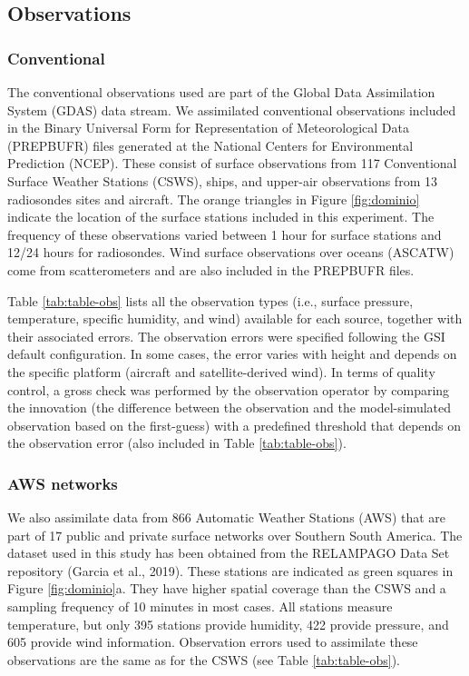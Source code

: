 \documentclass[final,5p,times,twocolumn,authoryear]{elsarticle} %
\begin{document}
\hypertarget{observations}{%
\subsection{Observations}\label{observations}}

\hypertarget{conventional}{%
\subsubsection{Conventional}\label{conventional}}

The conventional observations used are part of the Global Data Assimilation System (GDAS) data stream. We assimilated conventional observations included in the Binary Universal Form for Representation of Meteorological Data (PREPBUFR) files generated at the National Centers for Environmental Prediction (NCEP). These consist of surface observations from 117 Conventional Surface Weather Stations (CSWS), ships, and upper-air observations from 13 radiosondes sites and aircraft. The orange triangles in Figure \ref{fig:dominio} indicate the location of the surface stations included in this experiment. The frequency of these observations varied between 1 hour for surface stations and 12/24 hours for radiosondes. Wind surface observations over oceans (ASCATW) come from scatterometers and are also included in the PREPBUFR files.

Table \ref{tab:table-obs} lists all the observation types (i.e., surface pressure, temperature, specific humidity, and wind) available for each source, together with their associated errors. The observation errors were specified following the GSI default configuration. In some cases, the error varies with height and depends on the specific platform (aircraft and satellite-derived wind). In terms of quality control, a gross check was performed by the observation operator by comparing the innovation (the difference between the observation and the model-simulated observation based on the first-guess) with a predefined threshold that depends on the observation error (also included in Table \ref{tab:table-obs}).

\hypertarget{aws-networks}{%
\subsubsection{AWS networks}\label{aws-networks}}

We also assimilate data from 866 Automatic Weather Stations (AWS) that are part of 17 public and private surface networks over Southern South America. The dataset used in this study has been obtained from the RELAMPAGO Data Set repository (Garcia et al., 2019). These stations are indicated as green squares in Figure \ref{fig:dominio}a. They have higher spatial coverage than the CSWS and a sampling frequency of 10 minutes in most cases. All stations measure temperature, but only 395 stations provide humidity, 422 provide pressure, and 605 provide wind information.
Observation errors used to assimilate these observations are the same as for the CSWS (see Table \ref{tab:table-obs}).
\end{document}
